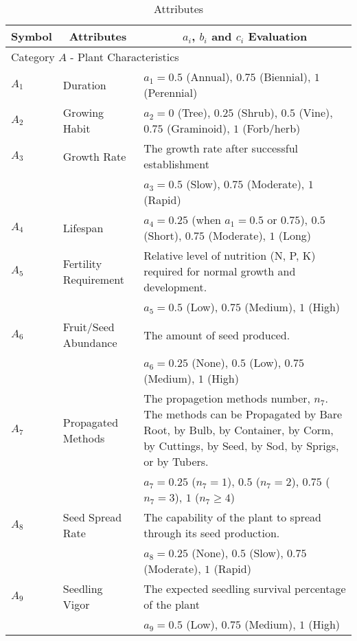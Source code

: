 \documentclass[12pt]{article}
\begin{document}
		{
			\fontsize{10}{14}\selectfont
			{
			\begin{longtable}{p{0.2in}p{1.5in}p{4.3in}}
				
				\caption{Attributes}
				\label{tb:attributes}\\
				
				\toprule
				\multicolumn{1}{c}{\textbf{Symbol}} 
					& \multicolumn{1}{c}{\textbf{Attributes}}
					& \multicolumn{1}{c}{\textbf{$a_i$, $b_i$ and $c_i$ Evaluation}} \\
			
				\toprule
				\multicolumn{3}{l}{Category $A$ - Plant Characteristics}\\
				\midrule
				
				$A_1$ & Duration & $a_1=0.5$ (Annual), $0.75$ (Biennial), $1$ (Perennial)\\
				$A_2$ & Growing Habit & $a_2=0$ (Tree), $0.25$ (Shrub), $0.5$ (Vine), $0.75$ (Graminoid), $1$ (Forb/herb)\\ 
				$A_3$ & Growth Rate & The growth rate after successful establishment\\
					&& $a_3=0.5$ (Slow), $0.75$ (Moderate), $1$ (Rapid)\\
				$A_4$ & Lifespan & $a_4=0.25$ (when $a_1=0.5$ or $0.75$), $0.5$ (Short), $0.75$ (Moderate), $1$ (Long) \\
				$A_5$ & Fertility Requirement & Relative level of nutrition (N, P, K) required for normal growth and development.\\
					 && $a_5=0.5$ (Low), $0.75$ (Medium), $1$ (High)\\
				$A_6$ & Fruit/Seed Abundance & The amount of seed produced.\\
					&& $a_6=0.25$ (None), $0.5$ (Low), $0.75$ (Medium), $1$ (High)\\
				$A_7$ & Propagated Methods & The propagetion methods number, $n_7$. The methods can be Propagated by Bare Root, by Bulb, by Container, by Corm, by Cuttings, by Seed, by Sod, by Sprigs, or by Tubers. \\
					&& $a_7=0.25$ ($n_7=1$), $0.5$ ($n_7=2$), $0.75$ ($n_7=3$), $1$ ($n_7\geq4$)\\
				$A_8$ & Seed Spread Rate & The capability of the plant to spread through its seed production.\\
					&& $a_8=0.25$ (None), $0.5$ (Slow), $0.75$ (Moderate), $1$ (Rapid)\\
				$A_9$ & Seedling Vigor & The expected seedling survival percentage of the plant\\
					&& $a_9=0.5$ (Low), $0.75$ (Medium), $1$ (High)\\
				

\end{longtable}}}
\end{document}

